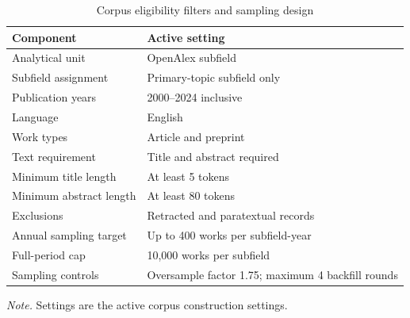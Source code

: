 \begin{table}[H]
\centering
\caption{Corpus eligibility filters and sampling design}
\label{tab:corpus_filters}
\footnotesize
\begin{tabular}{p{} p{}}
\hline
\textbf{Component} & \textbf{Active setting} \\
\hline
Analytical unit & OpenAlex subfield \\
Subfield assignment & Primary-topic subfield only \\
Publication years & 2000--2024 inclusive \\
Language & English \\
Work types & Article and preprint \\
Text requirement & Title and abstract required \\
Minimum title length & At least 5 tokens \\
Minimum abstract length & At least 80 tokens \\
Exclusions & Retracted and paratextual records \\
Annual sampling target & Up to 400 works per subfield-year \\
Full-period cap & 10,000 works per subfield \\
Sampling controls & Oversample factor 1.75; maximum 4 backfill rounds \\
\hline
\end{tabular}
\par\vspace{0.2cm}
\footnotesize\textit{Note.} Settings are the active corpus construction settings.
\end{table}
